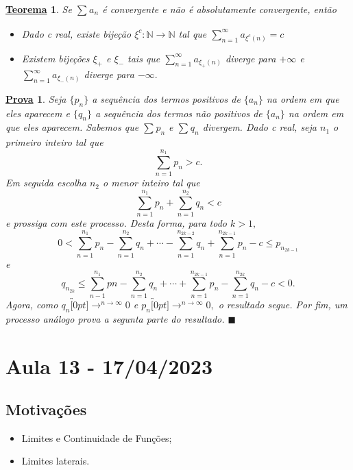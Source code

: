 \documentclass{article}
\newtheorem*{theorem*}{\underline{Teorema}}
\newtheorem*{proof*}{\underline{Prova}}
\renewcommand\qedsymbol{$\blacksquare$}
\begin{document}
\begin{theorem*}
  Se $\sum\limits_{}^{}a_{n}$ \'e convergente e n\~ao \'e absolutamente convergente, ent\~ao  
 \begin{itemize}
   \item[i)] Dado c real, existe bije\c c\~ao $\xi^{c}:\mathbb{N}\rightarrow \mathbb{N}$ tal que $\sum\limits_{n=1}^{\infty}a_{\xi^{c}(n)} = c$
     \item[ii)] Existem bije\c c\~oes $\xi_{+}$ e $\xi_{-}$ tais que $\sum_{n=1}^{\infty}a_{\xi_{+}(n)}$ diverge para $+\infty$
  e $\sum\limits_{n=1}^{\infty}a_{\xi_{-}(n)}$ diverge para $-\infty.$
 \end{itemize}
\end{theorem*}
\begin{proof*}
  Seja $\{p_{n}\}$ a sequ\^encia dos termos positivos de $\{a_{n}\}$ na ordem em que eles aparecem e $\{q_{n}\}$ a sequ\^encia dos termos 
  n\~ao positivos de $\{a_{n}\}$ na ordem em que eles aparecem. Sabemos que $\sum\limits_{}^{}p_{n}$ e $\sum\limits_{}^{}q_{n}$ divergem.
Dado c real, seja $n_{1}$ o primeiro inteiro tal que 
  $$
    \sum\limits_{n=1}^{n_{1}}p_{n} > c.
  $$
  Em seguida escolha $n_{2}$ o menor inteiro tal que 
    $$
      \sum\limits_{n=1}^{n_{1}}p_{n} + \sum\limits_{n=1}^{n_{2}}q_{n} < c
    $$
  e prossiga com este processo. Desta forma, para todo $k > 1,$ 
    $$
      0 < \sum\limits_{n=1}^{n_{1}}p_{n} - \sum\limits_{n=1}^{n_{2}}q_{n} + \cdots - \sum\limits_{n=1}^{n_{2k-2}}q_{n} + \sum\limits_{n=1}^{n_{2k-1}}p_{n} - c \leq{p_{n_{2k-1}}}
    $$
    e 
      $$
        q_{n_{2k}}\leq{\sum\limits_{n-1}^{n_{1}}pn} - \sum\limits_{n=1}^{n_{2}}q_{n} + \cdots + \sum\limits_{n=1}^{n_{2k-1}}p_{n} - \sum\limits_{n=1}^{n_{2k}}q_{n} - c < 0.
      $$
    Agora, como $q_{n}\overbracket[0pt]{\longrightarrow}^{n\to \infty}0$ e $p_{n}\overbracket[0pt]{\longrightarrow}^{n\to \infty}0,$ o resultado segue.
    Por fim, um processo an\'alogo prova a segunta parte do resultado. \qedsymbol
\end{proof*}
\newpage

\section{Aula 13 - 17/04/2023}
\subsection{Motiva\c c\~oes}
\begin{itemize}
  \item Limites e Continuidade de Fun\c c\~oes;
  \item Limites laterais.
\end{itemize}
\end{document}
